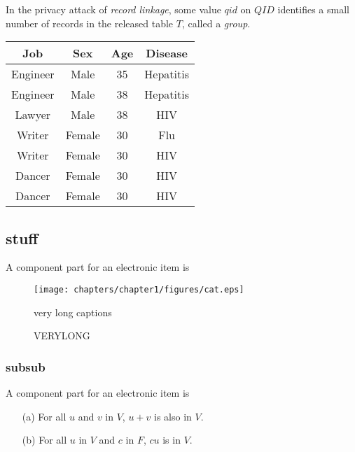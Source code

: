 In the privacy attack of \emph{record linkage}, some value $qid$ on $QID$ identifies a small number of records in the released table $T$, called a \emph{group}. 


\begin{table}
    \begin{tabular}{|c|c|c|c|}
        \hline
        \textbf{Job} & \textbf{Sex} & \textbf{Age} & \textbf{Disease} \\
        \hline
        Engineer & Male & 35 & Hepatitis \\
        Engineer & Male & 38 & Hepatitis \\
        Lawyer & Male & 38 & HIV \\
        Writer & Female & 30 & Flu \\
        Writer & Female & 30 & HIV \\
        Dancer & Female & 30 & HIV \\
        Dancer & Female & 30 & HIV \\
        \hline
    \end{tabular}
    \label{table:rawpatient}
\end{table}



\subsection{stuff}
A component part for an electronic item is


\begin{figure}[htb]
\texttt{[image: chapters/chapter1/figures/cat.eps]}
\caption[Short figure caption]{very long captions}
\end{figure}





\begin{figure}
\centering
{}
\caption[titleinmenu]{VERYLONG}
\end{figure}

\subsubsection{subsub}
A component part for an electronic item is
\begin{enumerate}
\item[\rm (a)] For all $u$ and $v$ in $V$, $u+v$ is
also in $V$.
\item[\rm (b)] For all $u$ in $V$ and $c$ in $F$, $cu$ is
in $V$.
\end{enumerate}


